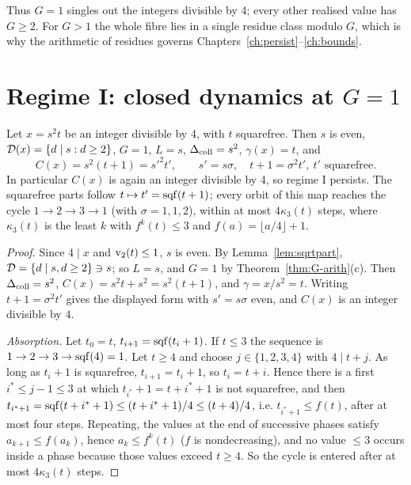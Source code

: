 Thus \(G=1\) singles out the integers divisible by 4; every other realised value has \(G\ge2\). For \(G>1\) the whole fibre lies in a single residue class modulo \(G\), which is why the arithmetic of residues governs Chapters~\ref{ch:persist}--\ref{ch:bounds}.

\section{\texorpdfstring{Regime I: closed dynamics at \(G=1\)}{Regime I: closed dynamics at G=1}}

\begin{theorem}[Regime I]\label{thm:regimeI}
Let \(x=s^2t\) be an integer divisible by 4, with \(t\) squarefree. Then \(s\) is even, \(\mathcal{D}(x)=\{d\mid s:d\ge2\}\), \(G=1\), \(L=s\), \(\Delta_{\mathrm{coll}}=s^2\), \(\gamma(x)=t\), and
\[
C(x)=s^2(t+1)=s'^2t',\qquad s'=s\sigma,\quad t+1=\sigma^2t',\ t'\text{ squarefree}.
\]
In particular \(C(x)\) is again an integer divisible by 4, so regime I persists. The squarefree parts follow \(t\mapsto t'=\operatorname{sqf}(t+1)\); every orbit of this map reaches the cycle \(1\to2\to3\to1\) (with \(\sigma=1,1,2\)), within at most \(4\kappa_3(t)\) steps, where \(\kappa_3(t)\) is the least \(k\) with \(f^k(t)\le3\) and \(f(a)=\lfloor a/4\rfloor+1\).
\end{theorem}
\begin{proof}
Since \(4\mid x\) and \(\operatorname{v}_2(t)\le1\), \(s\) is even. By Lemma~\ref{lem:sqrtpart}, \(\mathcal{D}=\{d\mid s,d\ge2\}\ni s\); so \(L=s\), and \(G=1\) by Theorem~\ref{thm:G-arith}(c). Then \(\Delta_{\mathrm{coll}}=s^2\), \(C(x)=s^2t+s^2=s^2(t+1)\), and \(\gamma=x/s^2=t\). Writing \(t+1=\sigma^2t'\) gives the displayed form with \(s'=s\sigma\) even, and \(C(x)\) is an integer divisible by \(4\).

\emph{Absorption.} Let \(t_0=t\), \(t_{i+1}=\operatorname{sqf}(t_i+1)\). If \(t\le3\) the sequence is \(1\to2\to3\to\operatorname{sqf}(4)=1\). Let \(t\ge4\) and choose \(j\in\{1,2,3,4\}\) with \(4\mid t+j\). As long as \(t_i+1\) is squarefree, \(t_{i+1}=t_i+1\), so \(t_i=t+i\). Hence there is a first \(i^*\le j-1\le3\) at which \(t_{i^*}+1=t+i^*+1\) is not squarefree, and then \(t_{i^*+1}=\operatorname{sqf}(t+i^*+1)\le(t+i^*+1)/4\le(t+4)/4\), i.e. \(t_{i^*+1}\le f(t)\), after at most four steps. Repeating, the values at the end of successive phases satisfy \(a_{k+1}\le f(a_k)\), hence \(a_k\le f^k(t)\) (\(f\) is nondecreasing), and no value \(\le3\) occurs inside a phase because those values exceed \(t\ge4\). So the cycle is entered after at most \(4\kappa_3(t)\) steps.
\end{proof}

